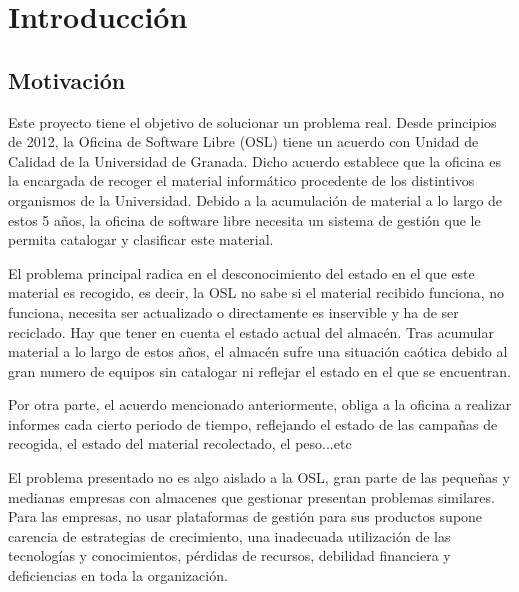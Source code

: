 \documentclass[a4paper,11pt]{book}
\begin{document}


\tableofcontents
\listoffigures

%

%


\chapter{Introducción}


\section{Motivación}

Este proyecto tiene el objetivo de solucionar un problema real. Desde principios de 2012, la Oficina de Software Libre (OSL) tiene un acuerdo con Unidad de Calidad de la Universidad de Granada. Dicho acuerdo establece que la oficina es la encargada de recoger el material  informático procedente de los distintivos organismos de la Universidad. Debido a la acumulación de material a lo largo de estos 5 años, la oficina de software libre necesita un sistema de gestión que le permita catalogar y clasificar este material.

El problema principal radica en el desconocimiento del estado en el que este material es recogido, es decir, la OSL no sabe si el material recibido funciona, no funciona, necesita ser actualizado o directamente es inservible y ha de ser reciclado. Hay que tener en cuenta el estado actual del almacén. Tras acumular material a lo largo de estos años, el almacén sufre una situación caótica debido al gran numero de equipos sin catalogar ni reflejar el estado en el que se encuentran. 

Por otra parte, el acuerdo mencionado anteriormente, obliga a la oficina a realizar informes cada cierto periodo de tiempo, reflejando el estado de las campañas de recogida, el estado del material recolectado, el peso...etc

El problema presentado no es algo aislado a la OSL, gran parte de las pequeñas y medianas empresas con almacenes que gestionar presentan problemas similares. Para las  empresas, no usar plataformas de gestión para sus productos supone carencia de estrategias de crecimiento, una inadecuada utilización de las tecnologías y conocimientos, pérdidas de recursos, debilidad financiera y deficiencias en toda la organización. 
\end{document}

